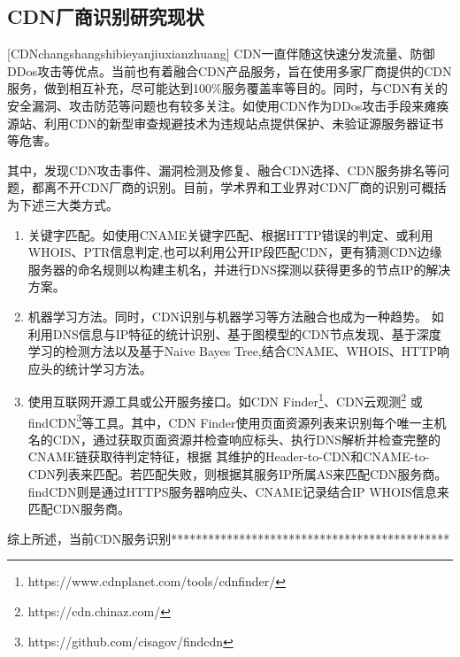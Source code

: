 \subsection{CDN厂商识别研究现状}[CDNchangshangshibieyanjiuxianzhuang]
CDN一直伴随这快速分发流量、防御DDos攻击等优点。当前也有着融合CDN产品服务，旨在使用多家厂商提供的CDN服务\cite{Zhu2021}，做到相互补充，尽可能达到100\%服务覆盖率等目的。同时，与CDN有关的安全漏洞、攻击防范等问题也有较多关注。如使用CDN作为DDos攻击手段\cite{Guo2020}来瘫痪源站、利用CDN的新型审查规避技术\cite{Wei2021}为违规站点提供保护、未验证源服务器证书\cite{SHOBIRI2021}等危害。

其中，发现CDN攻击事件、漏洞检测及修复、融合CDN选择、CDN服务排名等问题，都离不开CDN厂商的识别。目前，学术界和工业界对CDN厂商的识别可概括为下述三大类方式。


\begin{enumerate}[label={(\arabic*)}]


	\item 关键字匹配。如使用CNAME关键字匹配\cite{Adhikari2014}、根据HTTP错误\cite{Huang2008,Guo2018}的判定、或利用WHOIS\cite{Huang2008}、PTR\cite{Chen2019}信息判定,也可以利用公开IP段匹配CDN\cite{Choffnes2017}，更有猜测CDN边缘服务器的命名规则以构建主机名，并进行DNS探测以获得更多的节点IP\cite{Hohlfeld2018,Timm2018}的解决方案。
	\item 机器学习方法。同时，CDN识别与机器学习等方法融合也成为一种趋势。
如利用DNS信息与IP特征的统计识别\cite{Li2020}、基于图模型的CDN节点发现\cite{Ma2021}、基于深度学习的检测方法\cite{Chen2019}以及基于Naive Bayes Tree\cite{Liang2006},结合CNAME、WHOIS、HTTP响应头的统计学习方法\cite{Hou2021}。
	\item 使用互联网开源工具或公开服务接口。如CDN Finder\footnote{https://www.cdnplanet.com/tools/cdnfinder/}、CDN云观测\footnote{https://cdn.chinaz.com/}
	或findCDN\footnote{https://github.com/cisagov/findcdn}等工具。其中，CDN Finder使用页面资源列表来识别每个唯一主机名的CDN，通过获取页面资源并检查响应标头、执行DNS解析并检查完整的CNAME链获取待判定特征，根据
	其维护的Header-to-CDN和CNAME-to-CDN列表来匹配。若匹配失败，则根据其服务IP所属AS来匹配CDN服务商。findCDN则是通过HTTPS服务器响应头、CNAME记录结合IP WHOIS信息来匹配CDN服务商。
\end{enumerate}

综上所述，当前CDN服务识别*********************************************

